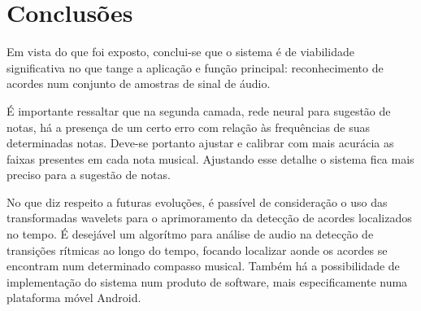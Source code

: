 \chapter{Conclusões}
\label{chap:conclusoes}

Em vista do que foi exposto, conclui-se que o sistema é de viabilidade significativa no que tange a aplicação e função principal: reconhecimento de acordes num conjunto de amostras de sinal de áudio.

É importante ressaltar que na segunda camada, rede neural para sugestão de notas, há a presença de um certo erro com relação às frequências de suas determinadas notas. Deve-se portanto ajustar e calibrar com mais acurácia as faixas presentes em cada nota musical. Ajustando esse detalhe o sistema fica mais preciso para a sugestão de notas.

No que diz respeito a futuras evoluções, é passível de consideração o uso das transformadas wavelets para o aprimoramento da detecção de acordes localizados no tempo. É desejável um algorítmo para análise de audio na detecção de transições rítmicas ao longo do tempo, focando localizar aonde os acordes se encontram num determinado compasso musical. Também há a possibilidade de implementação do sistema num produto de software, mais especificamente numa plataforma móvel Android.